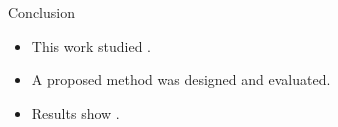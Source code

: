 \begin{frame}{Conclusion}

\begin{itemize}
    \item This work studied .
    \item A proposed method was designed and evaluated.
    \item Results show .
\end{itemize}

\end{frame}
